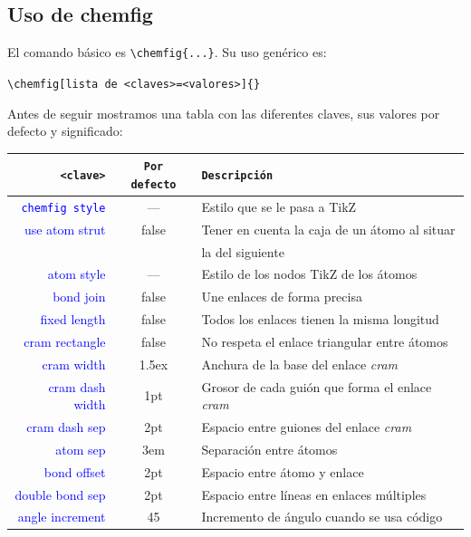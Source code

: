 \subsection{Uso de \textsf{chemfig}}
El comando básico es \texttt{\textbackslash chemfig\{...\}}.
Su uso genérico es:
\begin{center}
\texttt{\textbackslash chemfig[lista de <claves>=<valores>]\{<código de la molécula>\}}
\end{center}

Antes de seguir mostramos una tabla con las diferentes claves, sus valores por defecto y
significado:
\begin{center}
  \begin{longtable}{rcl}\hline
    \label{tbl:chemfig_claves}
  \texttt{<clave>} & \texttt{Por defecto} & \texttt{Descripción}\\\hline
  \textcolor{blue}{\texttt{chemfig style}}
  & ---
  & Estilo que se le pasa a \textsf{TikZ}\\
  \textcolor{blue}{use atom strut}
  & false
  & Tener en cuenta la caja de un átomo al situar\\&& la del siguiente\\
  \textcolor{blue}{atom style}
  & ---
  & Estilo de los nodos \textsf{TikZ} de los átomos\\
  \textcolor{blue}{bond join}
  & false
  & Une enlaces de forma precisa\\
  \textcolor{blue}{fixed length}
  & false
  & Todos los enlaces tienen la misma longitud\\
  \textcolor{blue}{cram rectangle}
  & false
  & No respeta el enlace triangular entre átomos\\
  \textcolor{blue}{cram width}
  & 1.5ex
  & Anchura de la base del enlace \emph{cram}\\
  \textcolor{blue}{cram dash width}
  & 1pt
  & Grosor de cada guión que forma el enlace \emph{cram}\\
  \textcolor{blue}{cram dash sep}
  & 2pt
  & Espacio entre guiones del enlace \emph{cram}\\
  \textcolor{blue}{atom sep}
  & 3em
  & Separación entre átomos\\
  \textcolor{blue}{bond offset}
  & 2pt
  & Espacio entre átomo y enlace\\
  \textcolor{blue}{double bond sep}
  & 2pt
  & Espacio entre líneas en enlaces múltiples\\
  \textcolor{blue}{angle increment}
  & 45
  & Incremento de ángulo cuando se usa código\\

\end{longtable}
\end{center}
